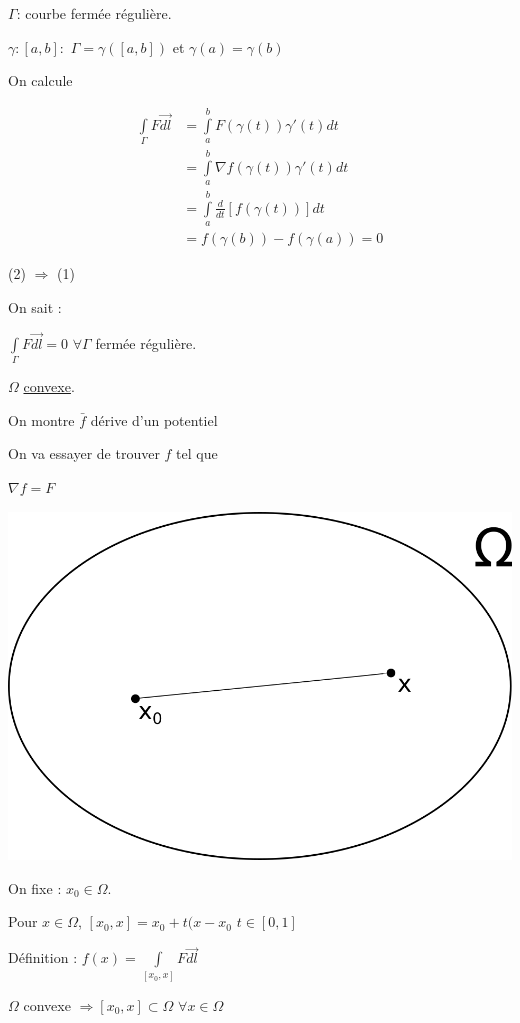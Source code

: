 \documentclass[11pt]{article}
\begin{document}
\(\Gamma\): courbe fermée régulière.

\(\gamma: [a,b]:\) \(\Gamma = \gamma([a,b])\) et \(\gamma(a)=\gamma(b)\)

On calcule 

\begin{align*}
 \int\limits_{\Gamma} F \vec{dl} &= \int\limits_a^b F(\gamma (t)) \gamma'(t) dt\\
  &= \int\limits_a^b \nabla f(\gamma(t)) \gamma'(t) dt \\
&= \int\limits_a^b \frac{d}{dt} \left[ f(\gamma(t)) \right] dt\\
&= f(\gamma(b)) - f(\gamma(a)) = 0
\end{align*}


(2) \(\Rightarrow\) (1)

On sait :

\(\int\limits_{\Gamma} F \vec{dl} = 0\) \(\forall \Gamma\) fermée régulière.

\(\Omega\) \href{https://fr.wikipedia.org/wiki/Ensemble_convexe}{convexe}.

On montre \(\bar{f}\) dérive d'un potentiel

On va essayer de trouver \(f\) tel que

\(\nabla f = F\)

\includegraphics[width=.9\linewidth]{images/an_ch3_01.png}

On fixe : \(x_0 \in \Omega\).

Pour \(x \in \Omega\), \([x_0,x] = x_0 + t(x-x_0\) \(t \in [0,1]\) 

Définition : \(f(x) = \int\limits_{[x_0,x]} F \vec{dl}\)

\(\Omega\) convexe \(\Rightarrow [x_0,x] \subset \Omega\) \(\forall x \in \Omega\)
\end{document}
